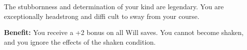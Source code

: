 
The stubbornness and determination of your kind are legendary. You are exceptionally headstrong and diffi cult to sway from your course.

\textbf{Benefit:} You receive a +2 bonus on all Will saves. You cannot become shaken, and you ignore the effects of the shaken condition.